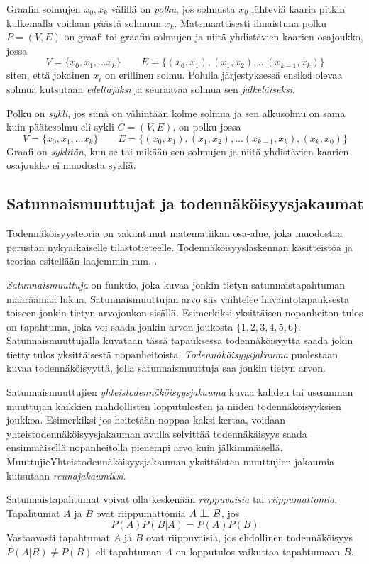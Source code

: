 Graafin solmujen $x_0, x_k$ välillä on \emph{polku}, jos solmusta $x_0$ lähteviä kaaria pitkin kulkemalla voidaan päästä solmuun $x_k$. Matemaattisesti ilmaistuna polku $P=(V,E)$ on graafi tai graafin solmujen ja niitä yhdistävien kaarien osajoukko, jossa 
$$
    V = \{x_0, x_1, \ldots x_k \} \qquad E = \{(x_0, x_1), (x_1,x_2),\ldots(x_{k-1}, x_k)\}
$$ 
siten, että jokainen $x_i$ on erillinen solmu. Polulla järjestyksessä ensiksi olevaa solmua kutsutaan \emph{edeltäjäksi} ja seuraavaa solmua sen \emph{jälkeläiseksi}.

Polku on \emph{sykli}, jos siinä on vähintään kolme solmua ja sen alkusolmu on sama kuin päätesolmu eli sykli $C = (V, E)$, on polku jossa
$$
    V = \{x_0, x_1, \ldots x_k \} \qquad E = \{(x_0, x_1), (x_1,x_2),\ldots(x_{k-1}, x_k), (x_k, x_0)\}
$$
Graafi on \emph{syklitön}, kun se tai mikään sen solmujen ja niitä yhdistävien kaarien osajoukko ei muodosta sykliä. 

\subsection{Satunnaismuuttujat ja todennäköisyysjakaumat}
Todennäköisyysteoria on vakiintunut matematiikan osa-alue, joka muodostaa perustan nykyaikaiselle tilastotieteelle. Todennäköisyyslaskennan käsitteistöä ja teoriaa esitellään laajemmin mm. \citet{dasgupta_probability_2011}.

\emph{Satunnaismuuttuja} on funktio, joka kuvaa jonkin tietyn satunnaistapahtuman määräämää lukua. Satunnaismuuttujan arvo siis vaihtelee havaintotapauksesta toiseen jonkin tietyn arvojoukon sisällä. Esimerkiksi yksittäisen nopanheiton tulos on tapahtuma, joka voi saada jonkin arvon joukosta $\{1,2,3,4,5,6\}$. Satunnaismuuttujalla kuvataan tässä tapauksessa todennäköisyyttä saada jokin tietty tulos yksittäisestä nopanheitoista. \emph{Todennäköisyysjakauma} puolestaan kuvaa todennäköisyyttä, jolla satunnaismuuttuja saa jonkin tietyn arvon.

Satunnaismuuttujien \emph{yhteistodennäköisyysjakauma} kuvaa kahden tai useamman muuttujan kaikkien mahdollisten lopputulosten ja niiden todennäköisyyksien joukkoa. Esimerkiksi jos heitetään noppaa kaksi kertaa, voidaan yhteistodennäköisyysjakauman avulla selvittää todennäkäisyys saada ensimmäisellä nopanheitolla pienempi arvo kuin jälkimmäisellä. MuuttujieYhteistodennäköisyysjakauman yksittäisten muuttujien jakaumia kutsutaan \emph{reunajakaumiksi}.

Satunnaistapahtumat voivat olla keskenään \emph{riippuvaisia} tai \emph{riippumattomia}. Tapahtumat $A$ ja $B$ ovat riippumattomia $A \perp \!\!\! \perp B$, jos
$$
    P(A)P(B|A) = P(A)P(B) 
$$
Vastaavasti tapahtumat $A$ ja $B$ ovat riippuvaisia, jos ehdollinen todennäköisyys $P(A|B) \not= P(B)$ eli tapahtuman $A$ on lopputulos vaikuttaa tapahtumaan $B$.

